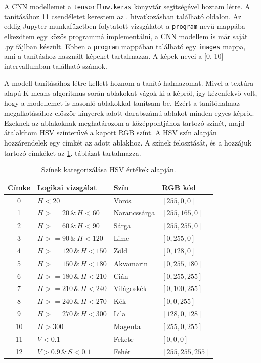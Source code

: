 
A CNN modellemet a \texttt{tensorflow.keras} könyvtár segítségével hoztam létre. A tanításához 11 csendéletet kerestem az \cite{unsplash}. hivatkozásban található oldalon. Az eddig Jupyter munkafüzetben folytatott vizsgálatot a \texttt{program} nevű mappába elkezdtem egy közös programmá implementálni, a CNN modellem is már saját .py fájlban készült. Ebben a \texttt{program} mappában található egy \texttt{images} mappa, ami a tanításhoz használt képeket tartalmazza. A képek nevei a [0, 10] intervallumban található számok.

A modell tanításához létre kellett hoznom a tanító halmazomat. Mivel a textúra alapú K-means algoritmus során ablakokat vágok ki a képről, így kézenfekvő volt, hogy a modellemet is hasonló ablakokkal tanítsam be. Ezért a tanítóhalmaz megalkotásához először kinyerek adott darabszámú ablakot minden egyes képről. Ezeknek az ablakoknak meghatározom a középpontjához tartozó színét, majd átalakítom HSV színterűvé a kapott RGB színt. A HSV szín alapján hozzárendelek egy címkét az adott ablakhoz. A színek felosztását, és a hozzájuk tartozó címkéket az \ref{tab:color_category}. táblázat tartalmazza.

\begin{table}[h]
\centering
\caption{Színek kategorizálása HSV értékek alapján.}
\label{tab:color_category}
\medskip
\begin{tabular}{|c|l|l|l|}
\hline
Címke & Logikai vizsgálat & Szín & RGB kód \\
\hline
0 & $H < 20$ & Vörös & $[255, 0, 0]$ \\
\hline
1 & $H >=20 \, \& \, H < 60$ & Narancssárga & $[255, 165, 0]$ \\
\hline
2 & $H >=60 \, \& \, H < 90$ & Sárga & $[255, 255, 0]$ \\
\hline
3 & $H >=90 \, \& \, H < 120$ & Lime & $[0, 255, 0]$ \\
\hline
4 & $H >=120 \, \& \, H < 150$ & Zöld & $[0, 128, 0]$ \\
\hline
5 & $H >=150 \, \& \, H < 180$ & Akvamarin & $[0, 255, 180]$ \\
\hline
6 & $H >=180 \, \& \, H < 210$ & Cián & $[0, 255, 255]$ \\
\hline
7 & $H >=210 \, \& \, H < 240$ & Világoskék & $[0, 100, 255]$ \\
\hline
8 & $H >=240 \, \& \, H < 270$ & Kék & $[0, 0, 255]$ \\
\hline
9 & $H >=270 \, \& \, H < 300$ & Lila & $[128, 0, 128]$ \\
\hline
10 & $H > 300$ & Magenta & $[255, 0, 255]$ \\
\hline
11 & $V < 0.1$ & Fekete & $[0, 0, 0]$ \\
\hline
12 & $V > 0.9 \, \& \, S < 0.1$ & Fehér & $[255, 255, 255]$\\
\hline
\end{tabular}

\end{table}

